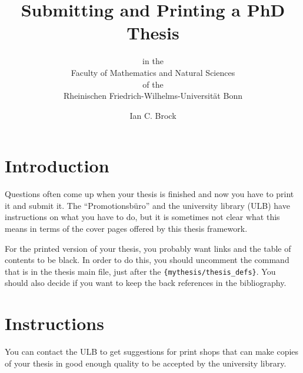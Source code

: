 \documentclass[a4paper, twoside, ngerman, UKenglish]{scrartcl}
\begin{document}
\title{Submitting and Printing a PhD Thesis}
\subtitle{\vspace*{4ex}
    in the\\
    Faculty of Mathematics and Natural Sciences\\
    of the\\
    Rheinischen Friedrich-Wilhelms-Universität Bonn
}
\author{Ian C. Brock}
\maketitle

\section{Introduction}
Questions often come up when your thesis is finished and now you have
to print it and submit it. The \foreignquote{ngerman}{Promotionsbüro}
and the university library (ULB) have instructions on what you have to
do, but it is sometimes not clear what this means in terms of the
cover pages offered by this thesis framework.

For the printed version of your thesis, you probably want
 links and the table of contents to be black. In
order to do this, you should uncomment the  command
that is in the thesis main file, just after the
\texttt{\{mythesis/thesis\_defs\}}.
You should also decide if you want to keep the back references in the bibliography.

\section{Instructions}


You can contact the ULB to get suggestions for print
shops that can make copies of your thesis in good enough quality to be
accepted by the university library.
\end{document}
